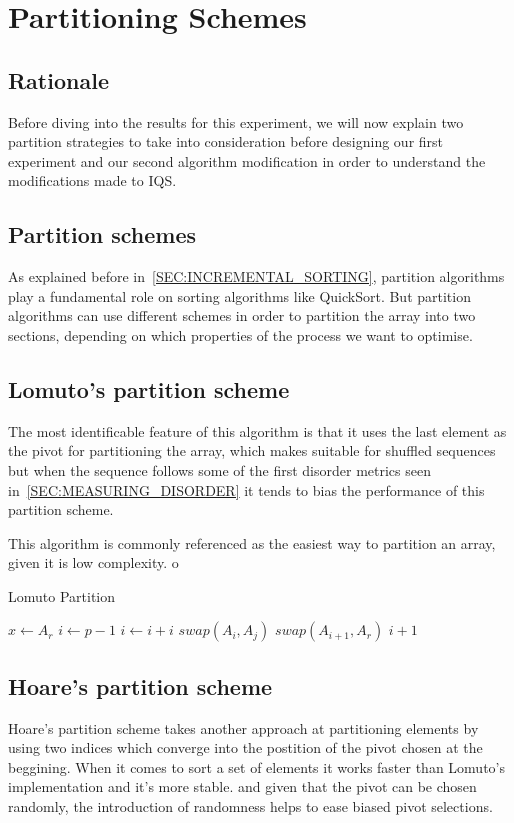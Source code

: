 \section{Partitioning Schemes}

\subsection{Rationale}
Before diving into the results for this experiment, we will now explain two partition strategies to take into consideration before designing our first experiment and our second algorithm modification in order to understand the modifications made to IQS.

\subsection{Partition schemes}
As explained before in~\ref{SEC:INCREMENTAL_SORTING}, partition algorithms play a fundamental role on sorting algorithms like QuickSort. But partition algorithms can use different schemes in order to partition the array into two sections, depending on which properties of the process we want to optimise.

\subsection{Lomuto's partition scheme}

The most identificable feature of this algorithm is that it uses the last element as the pivot for partitioning the array, which makes suitable for shuffled sequences but when the sequence follows some of the first disorder metrics seen in~\ref{SEC:MEASURING_DISORDER} it tends to bias the performance of this partition scheme.

This algorithm is commonly referenced as the easiest way to partition an array, given it is low complexity.
o
\begin{algorithm}
\caption{Lomuto Partition}\label{ALG:LOMUTO_PARTITION}
\begin{algorithmic}[1]
    \State $x \gets A_r$
    \State $i \gets p-1$
        \State $i \gets i + i$
        \State $swap(A_i, A_j)$
    \EndIf
    \EndFor
    \State $swap(A_{i+1}, A_r)$
    \State \Return $i + 1$
    \EndProcedure
\end{algorithmic}
\end{algorithm}

\subsection{Hoare's partition scheme}
Hoare's partition scheme takes another approach at partitioning elements by using two indices which converge into the postition of the pivot chosen at the beggining. When it comes to sort a set of elements it works faster than Lomuto's implementation and it's more stable. and given that the pivot can be chosen randomly, the introduction of randomness helps to ease biased pivot selections.


